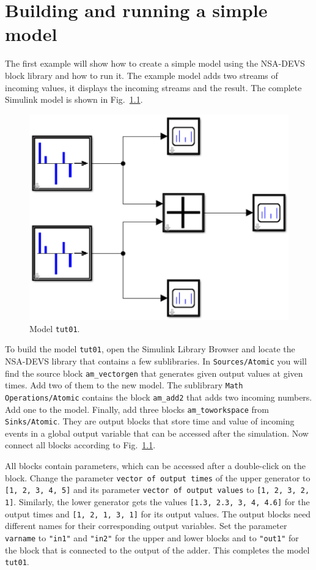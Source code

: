 \documentclass[12pt,oneside,a4paper,bibtotoc,BCOR=0pt,DIV=20]{scrreprt}
\newcommand{\cft}[1]{\mbox{\texttt{#1}}}   %
\begin{document}
 
\chapter{Building and running a simple model} \label{sec3}

The first example will show how to create a simple model using the NSA-DEVS
block library and how to run it. The example model adds two streams of incoming
values, it displays the incoming streams and the result. The complete Simulink
model is shown in Fig.\ \ref{fig_2}.
\begin{figure}[ht]
\centering
\includegraphics[width=0.34\columnwidth]{images/bild02.pdf}
\caption{Model \cft{tut01}.}
\label{fig_2}
\end{figure}

To build the model \cft{tut01}, open the Simulink Library Browser and locate
the NSA-DEVS library that contains a few sublibraries. In \cft{Sources/Atomic}
you will find the source block \cft{am\_vectorgen} that generates given output
values at given times. Add two of them to the new model. The sublibrary
\cft{Math Operations/Atomic} contains the block \cft{am\_add2} that adds two
incoming numbers. Add one to the model. Finally, add three blocks
\cft{am\_toworkspace} from \cft{Sinks/Atomic}. They are output blocks that
store time and value of incoming events in a global output variable that can be
accessed after the simulation. Now connect all blocks according to
Fig.\ \ref{fig_2}.

All blocks contain parameters, which can be accessed after a double-click on
the block. Change the parameter \cft{vector of output times} of the upper
generator to \cft{[1, 2, 3, 4, 5]} and its parameter \cft{vector of output
  values} to \cft{[1, 2, 3, 2, 1]}. Similarly, the lower generator gets the
values \cft{[1.3, 2.3, 3, 4, 4.6]} for the output times and \cft{[1, 2, 1, 3,
    1]} for its output values. The output blocks need different names for their
corresponding output variables. Set the parameter \cft{varname} to \cft{"in1"}
and \cft{"in2"} for the upper and lower blocks and to \cft{"out1"} for the
block that is connected to the output of the adder. This completes the model
\cft{tut01}.
\end{document}
